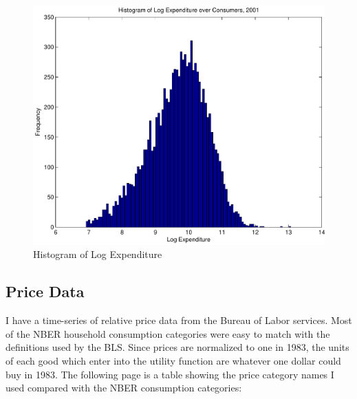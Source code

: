 \documentclass{article}
\begin{document}
\begin{figure}
	\begin{center}
		\includegraphics[scale=.8]{pics/exphist_cropped.pdf}
	\end{center}
	\label{fig:exphist}
	\caption{Histogram of  Log Expenditure}
\end{figure}
\subsection{Price Data}
I have a time-series of relative price data from the Bureau of Labor services.
Most of the NBER household consumption categories were easy to match with the definitions used by the BLS.   
Since prices are normalized to one in 1983, the units of each good which enter into the utility function are whatever one dollar could buy in 1983.
The following page is a table showing the price category names I used compared with the NBER consumption categories:
\end{document}
